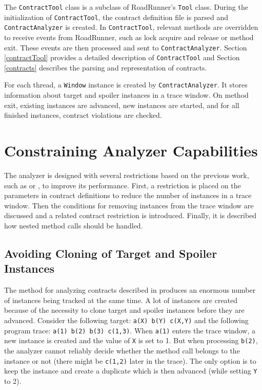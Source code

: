 The \texttt{ContractTool} class is a subclass of RoadRunner's \texttt{Tool}
class. During the initialization of \texttt{ContractTool}, the contract
definition file is parsed and \texttt{ContractAnalyzer} is created. In
\texttt{ContractTool}, relevant methods are overridden to receive events from
RoadRunner, such as lock acquire and release or method exit. These events are
then processed and sent to \texttt{ContractAnalyzer}. Section \ref{contractTool}
provides a detailed description of \texttt{ContractTool} and Section
\ref{contracts} describes the parsing and representation of contracts.

For each thread, a \texttt{Window} instance is created by
\texttt{ContractAnalyzer}. It stores information about target and spoiler
instances in a trace window. On method exit, existing instances are advanced,
new instances are started, and for all finished instances, contract violations
are checked.

\section{Constraining Analyzer Capabilities}
\label{constraining}

The analyzer is designed with several restrictions based on the previous work,
such as \cite{janousek} or \cite{FITPUB10817}, to improve its performance.
First, a restriction is placed on the parameters in contract definitions to
reduce the number of instances in a trace window. Then the conditions for
removing instances from the trace window are discussed and a related contract
restriction is introduced. Finally, it is described how nested method calls
should be handled.

\subsection{Avoiding Cloning of Target and Spoiler Instances}

The method for analyzing contracts described in \cite{janousek} produces an
enormous number of instances being tracked at the same time. A lot of instances
are created because of the necessity to clone target and spoiler instances
before they are advanced. Consider the following target: \texttt{a(X) b(Y)
c(X,Y)} and the following program trace: \texttt{a(1) b(2) b(3) c(1,3)}.  When
\texttt{a(1)} enters the trace window, a new instance is created and the value
of \texttt{X} is set to 1. But when processing \texttt{b(2)}, the analyzer
cannot reliably decide whether the method call belongs to the instance or not
(there might be \texttt{c(1,2)} later in the trace). The only option is to keep
the instance and create a duplicate which is then advanced (while setting
\texttt{Y} to 2).

